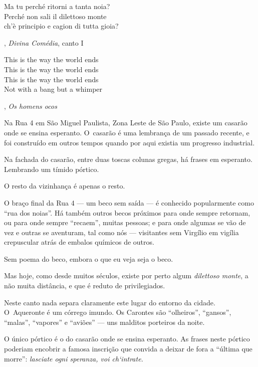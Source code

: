  

\epigraph{Ma tu perché ritorni a tanta noia?\\ Perché non sali il dilettoso
monte\\ ch'è principio e cagion di tutta gioia?}{, \textit{Divina Comédia}, canto I} 



\epigraph{This is the way the world ends\\ This is the way the world ends\\ This
is the way the world ends\\ Not with a bang but a whimper}{, \textit{Os homens ocos}} 

 


Na Rua 4 em São Miguel Paulista, Zona Leste de São Paulo, existe um
casarão onde se ensina esperanto. O~casarão é uma lembrança de um
passado recente, e foi construído em outros tempos quando por aqui
existia um progresso industrial.

Na fachada do casarão, entre duas toscas colunas gregas, há frases em
esperanto. Lembrando um tímido pórtico.

O resto da vizinhança é apenas o resto.

\asterisc{}

O braço final da Rua 4 --- um beco sem saída --- é conhecido
popularmente como ``rua dos noias''. Há também outros becos próximos
para onde sempre retornam, ou para onde sempre ``recaem'', muitas
pessoas; e para onde algumas se vão de vez e outras se aventuram, tal
como nós --- visitantes sem Virgílio em vigília crepuscular atrás de
embalos químicos de outros.

Sem poema do beco, embora o que eu veja seja o beco.

Mas hoje, como desde muitos séculos, existe por perto algum
\emph{dilettoso monte}, a não muita distância, e que é reduto de
privilegiados.

\asterisc{}

Neste canto nada separa claramente este lugar do entorno da cidade. O~Aqueronte é um córrego imundo. Os Carontes são ``olheiros'', ``gansos'',
``malas'', ``vapores'' e ``aviões'' --- uns malditos porteiros da noite.

O único pórtico é o do casarão onde se ensina esperanto. As frases neste
pórtico poderiam encobrir a famosa inscrição que convida a deixar de
fora a ``última que morre'': \emph{lasciate ogni speranza, voi
ch`intrate.}

